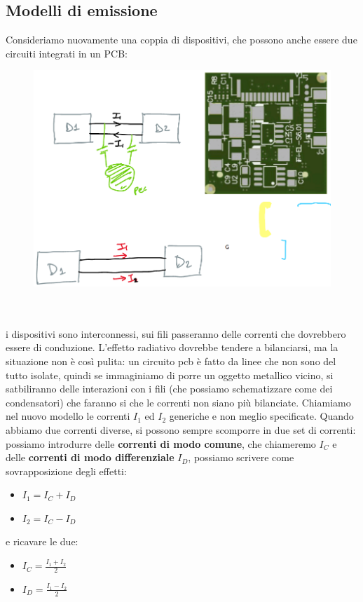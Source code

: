 \documentclass[oneside, 12pt]{extbook}
\begin{document}
\subsection{Modelli di emissione}
Consideriamo nuovamente una coppia di dispositivi, che possono anche essere due circuiti integrati in un PCB:\\
\begin{figure}[!h]
	\includegraphics[scale=0.2]{immagini/pcb.png}
\end{figure}
\\\\i dispositivi sono interconnessi, sui fili passeranno delle correnti che dovrebbero essere di conduzione. L'effetto radiativo dovrebbe tendere a bilanciarsi, ma la situazione non è così pulita: un circuito pcb è fatto da linee che non sono del tutto isolate, quindi se immaginiamo di porre un oggetto metallico vicino, si satbiliranno delle interazioni con i fili (che possiamo schematizzare come dei condensatori) che faranno si che le correnti non siano più bilanciate. Chiamiamo nel nuovo modello le correnti $I_1$ ed $I_2$ generiche e non meglio specificate. Quando abbiamo due correnti diverse, si possono sempre scomporre in due set di correnti: possiamo introdurre delle \textbf{correnti di modo comune}, che chiameremo $I_C$ e delle \textbf{correnti di modo differenziale} $I_D$, possiamo scrivere come sovrapposizione degli effetti:
\begin{itemize}
	\item $I_1 = I_C + I_D$
	\item $I_2 = I_C - I_D$
\end{itemize}
e ricavare le due:
\begin{itemize}
	\item $I_C = \frac{I_1 + I_2}{2}$
	\item $I_D = \frac{I_1 - I_2}{2}$
\end{itemize}
\end{document}
